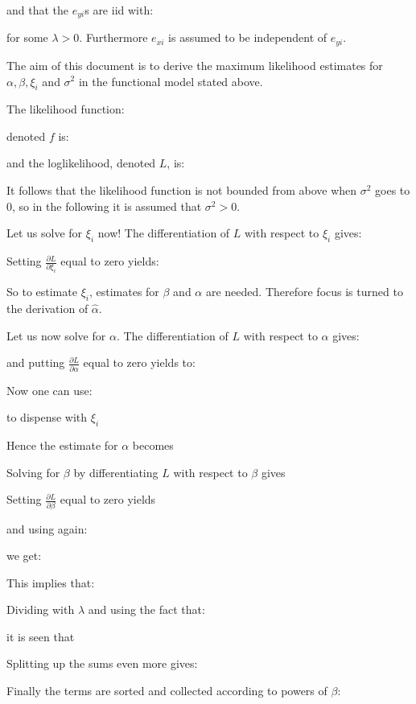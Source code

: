 	and that the $e_{yi}$s are iid with:
	
	for some $\lambda>0$. Furthermore $e_{xi}$ is assumed to be independent of $e_{yi}$.
	
	The aim of this document is to derive the maximum
	likelihood estimates for $\alpha, \beta, \xi_i$ and $\sigma^2$ in the functional model stated above.

	The likelihood function:
	
	denoted $f$ is:
	
	and the loglikelihood, denoted $L$, is:
	
	It follows that the likelihood function is not bounded from above when $\sigma^2$ goes to $0$, so in the following it is assumed that $\sigma^2>0$.

	Let us solve for $\xi_i$ now! The differentiation of $L$ with respect to $\xi_i$ gives:
	
	Setting $\frac{\partial L}{\partial \xi_i}$ equal to zero yields:
	
	So to estimate $\xi_i$, estimates for $\beta$ and $\alpha$ are needed. Therefore focus is turned to the derivation of $\hat{\alpha}$.

	Let us now solve for $\alpha$. The differentiation of $L$ with respect to $\alpha$ gives:
	
	and putting $\frac{\partial L}{\partial \alpha}$ equal to zero yields to:
	
	Now one can use:
	
	to dispense with $\xi_i$
		
	
	Hence the estimate for $\alpha$ becomes
	

	Solving for $\beta$ by differentiating  $L$ with respect to $\beta$ gives
	
	Setting $\frac{\partial L}{\partial \beta}$ equal to zero yields
	
	and using again:
	
	we get:
	
	This implies that:
	
	Dividing with $\lambda$ and using the fact that:
	
	it is seen that
	
	Splitting up the sums even more gives:
	
Finally the terms are sorted and collected according to powers of $\beta$:
	
